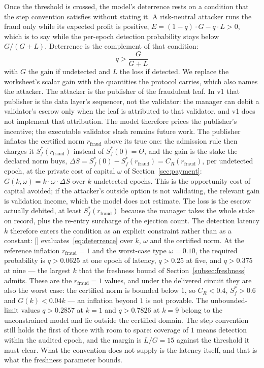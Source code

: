 \documentclass[11pt,a4paper]{article}
\newcommand{\fref}[1]{[\path{#1}]}
\numberwithin{equation}{section}
\numberwithin{table}{section}
\begin{document}
Once the threshold is crossed, the model's deterrence rests on a condition that the step convention satisfies without stating it. A risk-neutral attacker runs the fraud only while its expected profit is positive, $E = (1-q) \cdot G - q \cdot L > 0$, which is to say while the per-epoch detection probability stays below $G/(G+L)$. Deterrence is the complement of that condition:
\begin{equation}
q > \frac{G}{G + L}
\label{eq:deterrence}
\end{equation}
with $G$ the gain if undetected and $L$ the loss if detected. We replace the worksheet's scalar gain with the quantities the protocol carries, which also names the attacker. The attacker is the publisher of the fraudulent leaf. In v1 that publisher is the data layer's sequencer, not the validator: the manager can debit a validator's escrow only when the leaf is attributed to that validator, and v1 does not implement that attribution. The model therefore prices the publisher's incentive; the executable validator slash remains future work. The publisher inflates the certified norm $r_{\mathrm{fraud}}$ above its true one: the admission rule then charges it $S_f^*(r_{\mathrm{fraud}})$ instead of $S_f^*(0) = \Theta$, and the gain is the stake the declared norm buys, $\Delta S = S_f^*(0) - S_f^*(r_{\mathrm{fraud}}) = C_R(r_{\mathrm{fraud}})$, per undetected epoch, at the private cost of capital $\omega$ of Section~\ref{sec:payment}: $G(k, \omega) = k \cdot \omega \cdot \Delta S$ over $k$ undetected epochs. This is the opportunity cost of capital avoided; if the attacker's outside option is not validating, the relevant gain is validation income, which the model does not estimate. The loss is the escrow actually debited, at least $S_f^*(r_{\mathrm{fraud}})$ because the manager takes the whole stake on record, plus the re-entry surcharge of the ejection count. The detection latency $k$ therefore enters the condition as an explicit constraint rather than as a constant: \fref{verification/mechanism/m05_attack_model.py} evaluates~\eqref{eq:deterrence} over $k$, $\omega$ and the certified norm. At the reference inflation $r_{\mathrm{fraud}} = 1$ and the worst-case type $\omega = 0.10$, the required probability is $q > 0.0625$ at one epoch of latency, $q > 0.25$ at five, and $q > 0.375$ at nine --- the largest $k$ that the freshness bound of Section~\ref{subsec:freshness} admits. These are the $r_{\mathrm{fraud}}=1$ values, and under the delivered circuit they are also the worst case: the certified norm is bounded below $1$, so $C_R<0.4$, $S_f^*>0.6$ and $G(k)<0.04k$ --- an inflation beyond $1$ is not provable. The unbounded-limit values $q>0.2857$ at $k=1$ and $q>0.7826$ at $k=9$ belong to the unconstrained model and lie outside the certified domain. The step convention still holds the first of those with room to spare: coverage of $1$ means detection within the audited epoch, and the margin is $L/G = 15$ against the threshold it must clear. What the convention does not supply is the latency itself, and that is what the freshness parameter bounds.
\end{document}
